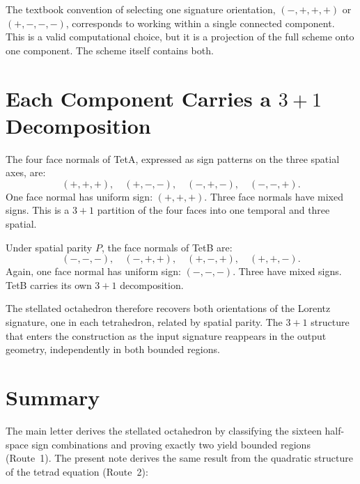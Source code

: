 \documentclass[twocolumn]{iopjournal}
\begin{document}
The textbook convention of selecting one signature orientation, $(-,+,+,+)$ or $(+,-,-,-)$, corresponds to working within a single connected component. This is a valid computational choice, but it is a projection of the full scheme onto one component. The scheme itself contains both.


\section*{Each Component Carries a $3+1$ Decomposition}

The four face normals of TetA, expressed as sign patterns on the three spatial axes, are:
\begin{equation}
(+,+,+), \quad (+,-,-), \quad (-,+,-), \quad (-,-,+).
\end{equation}
One face normal has uniform sign: $(+,+,+)$. Three face normals have mixed signs. This is a $3+1$ partition of the four faces into one temporal and three spatial.

Under spatial parity $P$, the face normals of TetB are:
\begin{equation}
(-,-,-), \quad (-,+,+), \quad (+,-,+), \quad (+,+,-).
\end{equation}
Again, one face normal has uniform sign: $(-,-,-)$. Three have mixed signs. TetB carries its own $3+1$ decomposition.

The stellated octahedron therefore recovers both orientations of the Lorentz signature, one in each tetrahedron, related by spatial parity. The $3+1$ structure that enters the construction as the input signature reappears in the output geometry, independently in both bounded regions.


\section*{Summary}

The main letter derives the stellated octahedron by classifying the sixteen half-space sign combinations and proving exactly two yield bounded regions (Route~1). The present note derives the same result from the quadratic structure of the tetrad equation (Route~2):
\end{document}
